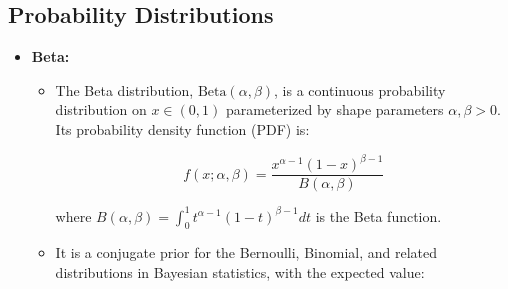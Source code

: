 \documentclass[12pt,a4paper]{article}
\begin{document}
\subsection{Probability Distributions}
\begin{itemize}
\item \textbf{Beta: }
\begin{itemize}
      \item The Beta distribution, \( \text{Beta}(\alpha, \beta) \), is a continuous probability distribution on \( x \in (0,1) \) parameterized by shape parameters \( \alpha, \beta > 0 \). Its probability density function (PDF) is:

  \[
  f(x; \alpha, \beta) = \frac{x^{\alpha-1} (1-x)^{\beta-1}}{B(\alpha, \beta)}
  \]

  where \( B(\alpha, \beta) = \int_0^1 t^{\alpha-1} (1-t)^{\beta-1} dt \) is the Beta function.

\item It is a conjugate prior for the Bernoulli, Binomial, and related distributions in Bayesian statistics, with the expected value:


\end{itemize}
\end{itemize}
\end{document}
